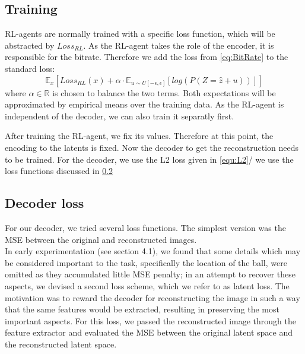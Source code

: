 



\subsection{Training}
    RL-agents are normally trained with a specific loss function, which will be
    abstracted by $Loss_{RL}$. As the RL-agent takes the role of the encoder, it
    is responsible for the bitrate. Therefore we add the loss from
    \ref{eq:BitRate} to the standard loss:
    \begin{equation}
        \mathbb{E}_{x}[Loss_{RL}(x) + \alpha\cdot \mathbb{E}_{u \sim U[-\epsilon, \epsilon]}[log(P(Z=\hat{z} + u))]]
    \end{equation} where $\alpha \in \mathbb{R}$ is chosen to balance the two terms.
    Both expectations will be approximated by empirical means over the training
    data. As the RL-agent is independent of the decoder, we can also train it
    separatly first.

    After training the RL-agent, we fix its values. Therefore at this point, the
    encoding to the latents is fixed. Now the decoder to get the reconstruction
    needs to be trained. For the decoder, we use the L2 loss given in \ref{equ:L2}/ we use the loss functions discussed in \ref{sub:Decoder_Loss}

\subsection{Decoder loss}\label{sub:Decoder_Loss}
    For our decoder, we tried several loss functions. The simplest version was
    the MSE between the original and reconstructed images. \\
    In early experimentation (see section 4.1), we found that some details which
    may be considered important to the task, specifically the location of the
    ball, were omitted as they accumulated little MSE penalty; in an attempt to
    recover these aspects, we devised a second loss scheme, which we refer to as
    latent loss. The motivation was to reward the decoder for reconstructing the
    image in such a way that the same features would be extracted, resulting in
    preserving the most important aspects. For this loss, we passed the
    reconstructed image through the feature extractor and evaluated the MSE
    between the original latent space and the reconstructed latent space.

